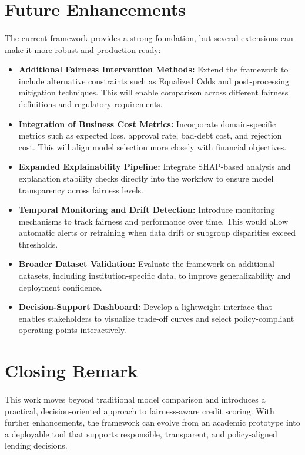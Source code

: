 \section{Future Enhancements}
\paragraph{}
The current framework provides a strong foundation, but several extensions can make it more robust and production-ready:

\begin{itemize}
    \item \textbf{Additional Fairness Intervention Methods:}  
    Extend the framework to include alternative constraints such as Equalized Odds and post-processing mitigation techniques. This will enable comparison across different fairness definitions and regulatory requirements.

    \item \textbf{Integration of Business Cost Metrics:}  
    Incorporate domain-specific metrics such as expected loss, approval rate, bad-debt cost, and rejection cost. This will align model selection more closely with financial objectives.

    \item \textbf{Expanded Explainability Pipeline:}  
    Integrate SHAP-based analysis and explanation stability checks directly into the workflow to ensure model transparency across fairness levels.

    \item \textbf{Temporal Monitoring and Drift Detection:}  
    Introduce monitoring mechanisms to track fairness and performance over time. This would allow automatic alerts or retraining when data drift or subgroup disparities exceed thresholds.

    \item \textbf{Broader Dataset Validation:}  
    Evaluate the framework on additional datasets, including institution-specific data, to improve generalizability and deployment confidence.

    \item \textbf{Decision-Support Dashboard:}  
    Develop a lightweight interface that enables stakeholders to visualize trade-off curves and select policy-compliant operating points interactively.
\end{itemize}

\section{Closing Remark}
\paragraph{}
This work moves beyond traditional model comparison and introduces a practical, decision-oriented approach to fairness-aware credit scoring. With further enhancements, the framework can evolve from an academic prototype into a deployable tool that supports responsible, transparent, and policy-aligned lending decisions.